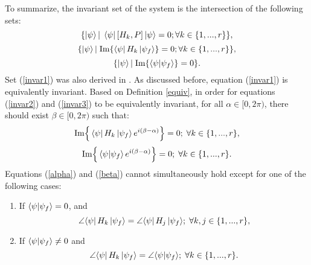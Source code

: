 \documentclass[journal]{IEEEtran}
\theoremstyle{definition}
\begin{document}
To summarize, the invariant set of the system is the intersection of the following sets:
\begin{equation}\label{invar1}
   \{\ket{\psi}| \; \bra{\psi}[H_k,P]\ket{\psi}=0; \forall{k}\in \{1,...,r\}\},
\end{equation}
\begin{equation}\label{invar2}
    \{\ket{\psi}| \; \text{Im}\{\bra{\psi}H_k\ket{\psi_f}\}=0 ; \forall{k}\in \{1,...,r\}\},
\end{equation}
\begin{equation}\label{invar3}
    \{\ket{\psi}| \; \text{Im}\{\braket{\psi|\psi_f}\}=0\}.
\end{equation}
Set (\ref{invar1}) was also derived in \cite{grivopoulos2003lyapunov}. As discussed before, equation (\ref{invar1}) is equivalently invariant. Based on Definition \ref{equiv}, in order for equations (\ref{invar2}) and (\ref{invar3}) to be equivalently invariant, for all $\alpha \in[0,2\pi)$, there should exist $\beta\in[0,2\pi)$ such that:
\begin{equation}\label{alpha}
    \text{Im}\Big\{\bra{\psi}H_k \ket{\psi_f}e^{i(\beta-\alpha)}\Big\}=0 ; \; \forall{k}\in \{1,...,r\},
\end{equation}
\begin{equation}\label{beta}
     \text{Im}\Big\{\braket{\psi|\psi_f}e^{i(\beta-\alpha)}\Big\}=0 ; \; \forall{k}\in \{1,...,r\}.
\end{equation}
Equations (\ref{alpha}) and (\ref{beta}) cannot simultaneously hold except for one of the following cases:
 \begin{enumerate}[label=(\roman*)]
 \item If $\braket{\psi|\psi_f}=0$, and
 \begin{equation}\label{cond1}
     \angle{\bra{\psi}H_k \ket{\psi_f}}=\angle{\bra{\psi}H_j \ket{\psi_f}}; \; \forall{k,j}\in \{1,...,r\},
 \end{equation}
 \item If $\braket{\psi|\psi_f}\neq0$ and
  \begin{equation}\label{cond2}
     \angle{\bra{\psi}H_k \ket{\psi_f}}=\angle{\braket{\psi|\psi_f}}; \; \forall{k}\in \{1,...,r\}.
 \end{equation}
 \end{enumerate}
\end{document}
